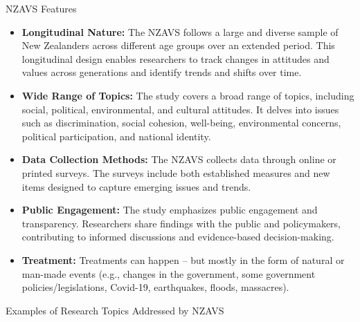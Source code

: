 \documentclass[
  ignorenonframetext,
  aspectratio=169,
]{beamer}
\providecommand{\tightlist}{%
  \setlength{\itemsep}{0pt}\setlength{\parskip}{0pt}}\usepackage{longtable,booktabs,array}
\begin{document}
\begin{frame}{NZAVS Features}
\label{nzavs-features}
\begin{itemize}[<+->]
\tightlist
\item
  \textbf{Longitudinal Nature:} The NZAVS follows a large and diverse
  sample of New Zealanders across different age groups over an extended
  period. This longitudinal design enables researchers to track changes
  in attitudes and values across generations and identify trends and
  shifts over time.
\item
  \textbf{Wide Range of Topics:} The study covers a broad range of
  topics, including social, political, environmental, and cultural
  attitudes. It delves into issues such as discrimination, social
  cohesion, well-being, environmental concerns, political participation,
  and national identity.
\item
  \textbf{Data Collection Methods:} The NZAVS collects data through
  online or printed surveys. The surveys include both established
  measures and new items designed to capture emerging issues and trends.
\end{itemize}
\end{frame}

\begin{frame}
\begin{itemize}[<+->]
\tightlist
\item
  \textbf{Public Engagement:} The study emphasizes public engagement and
  transparency. Researchers share findings with the public and
  policymakers, contributing to informed discussions and evidence-based
  decision-making.
\item
  \textbf{Treatment:} Treatments can happen -- but mostly in the form of
  natural or man-made events (e.g., changes in the government, some
  government policies/legislations, Covid-19, earthquakes, floods,
  massacres).
\end{itemize}
\end{frame}

\begin{frame}{Examples of Research Topics Addressed by NZAVS}
\label{examples-of-research-topics-addressed-by-nzavs}
\end{frame}
\end{document}
